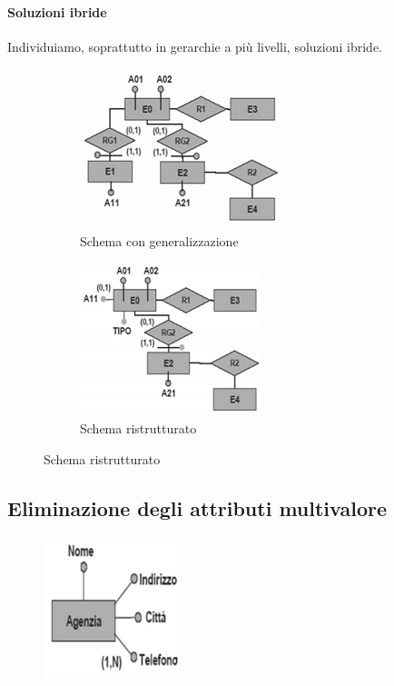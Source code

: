 \paragraph{Soluzioni ibride} Individuiamo, soprattutto in gerarchie a più livelli, soluzioni ibride. 
\begin{figure}[h]
	\begin{subfigure}{0.5\textwidth}
		\includegraphics{images/105.PNG} 
		\caption{Schema con generalizzazione}
	\end{subfigure}
	\begin{subfigure}{0.5\textwidth}
		\includegraphics{images/106.PNG}
		\caption{Schema ristrutturato}
	\end{subfigure}
\end{figure}
\normalsize
\subsection{Eliminazione degli attributi multivalore}
\begin{figure}
	\includegraphics{images/107.PNG} 
	\vspace*{-30pt}
\end{figure}

